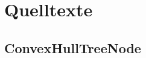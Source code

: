 
\chapter{Quelltexte}
\minitoc
\newpage
\begin{landscape}
\section{ConvexHullTreeNode}
\begin{tiny}

\end{tiny}
\end{landscape}